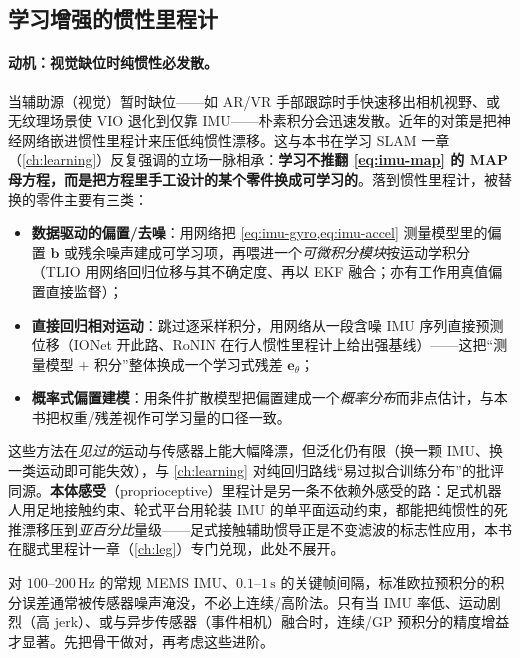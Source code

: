 \subsection{学习增强的惯性里程计}
\label{subsec:advanced-misc}

\paragraph{动机：视觉缺位时纯惯性必发散。}
当辅助源（视觉）暂时缺位——如 AR/VR 手部跟踪时手快速移出相机视野、或无纹理场景使 VIO 退化到仅靠 IMU——朴素积分会迅速发散。近年的对策是把神经网络嵌进惯性里程计来压低纯惯性漂移\cite{carlone2026handbook}。这与本书在学习 SLAM 一章（\cref{ch:learning}）反复强调的立场一脉相承：\textbf{学习不推翻 \cref{eq:imu-map} 的 MAP 母方程，而是把方程里手工设计的某个零件换成可学习的}。落到惯性里程计，被替换的零件主要有三类：
\begin{itemize}
  \item \textbf{数据驱动的偏置/去噪}：用网络把 \cref{eq:imu-gyro,eq:imu-accel} 测量模型里的偏置 $\mathbf b$ 或残余噪声建成可学习项，再喂进一个\emph{可微积分模块}按运动学积分（TLIO\cite{liu2020tlio} 用网络回归位移与其不确定度、再以 EKF 融合；亦有工作用真值偏置直接监督）；
  \item \textbf{直接回归相对运动}：跳过逐采样积分，用网络从一段含噪 IMU 序列直接预测位移（IONet\cite{chen2018ionet} 开此路、RoNIN\cite{herath2020ronin} 在行人惯性里程计上给出强基线）——这把“测量模型 $+$ 积分”整体换成一个学习式残差 $\mathbf e_\theta$；
  \item \textbf{概率式偏置建模}：用条件扩散模型把偏置建成一个\emph{概率分布}而非点估计\cite{carlone2026handbook}，与本书把权重/残差视作可学习量的口径一致。
\end{itemize}
这些方法在\emph{见过的}运动与传感器上能大幅降漂，但泛化仍有限（换一颗 IMU、换一类运动即可能失效），与 \cref{ch:learning} 对纯回归路线“易过拟合训练分布”的批评同源。\textbf{本体感受}（proprioceptive）里程计是另一条不依赖外感受的路：足式机器人用足地接触约束、轮式平台用轮装 IMU 的单平面运动约束，都能把纯惯性的死推漂移压到\emph{亚百分比}量级——足式接触辅助惯导正是不变滤波的标志性应用，本书在腿式里程计一章（\cref{ch:leg}）专门兑现，此处不展开。

\begin{insight}[什么时候需要超越欧拉预积分]\label{ins:beyond-euler}
对 $100$--$200\,\mathrm{Hz}$ 的常规 MEMS IMU、$0.1$--$1\,\mathrm s$ 的关键帧间隔，标准欧拉预积分的积分误差通常被传感器噪声淹没，不必上连续/高阶法。只有当 IMU 率低、运动剧烈（高 jerk）、或与异步传感器（事件相机）融合时，连续/GP 预积分的精度增益才显著。先把骨干做对，再考虑这些进阶。
\end{insight}

